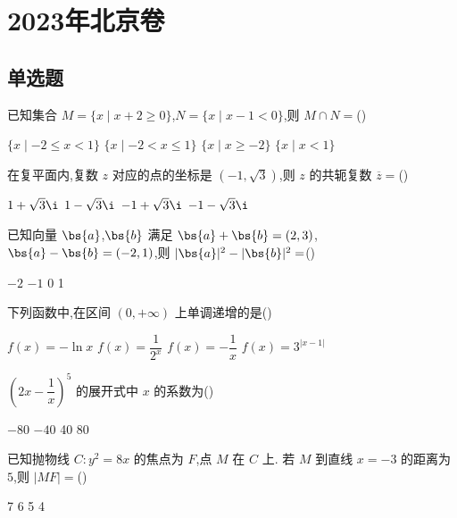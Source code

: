 \chapter{2023年北京卷}

\section{单选题}

\begin{problem}
已知集合 \(M=\{x\mid x+2\ge 0\}\),\(N=\{x\mid x-1<0\}\),则 \(M\cap N=\)(\quad)

\choices
    {\(\{x\mid -2\le x<1\}\)}
    {\(\{x\mid -2<x\le 1\}\)}
    {\(\{x\mid x\ge -2\}\)}
    {\(\{x\mid x<1\}\)}
\end{problem}

\begin{problem}
在复平面内,复数 \(z\) 对应的点的坐标是 \((-1,\sqrt{3})\),则 \(z\) 的共轭复数 \(\overline{z}=\)(\quad)

\choices
    {\(1+\sqrt{3}\i\)}
    {\(1-\sqrt{3}\i\)}
    {\(-1+\sqrt{3}\i\)}
    {\(-1-\sqrt{3}\i\)}
\end{problem}

\begin{problem}
已知向量 \(\bs{a}\),\(\bs{b}\) 满足 \(\bs{a}+\bs{b}=(2,3)\),\(\bs{a}-\bs{b}=(-2,1)\),则 \(|\bs{a}|^2-|\bs{b}|^2=\)(\quad)

\choices
    {\(-2\)}
    {\(-1\)}
    {0}
    {1}
\end{problem}

\begin{problem}
下列函数中,在区间 \((0,+\infty)\) 上单调递增的是(\quad)

\choices
    {\(f(x)=-\ln x\)}
    {\(f(x)=\dfrac{1}{2^x}\)}
    {\(f(x)=-\dfrac{1}{x}\)}
    {\(f(x)=3^{|x-1|}\)}
\end{problem}

\begin{problem}
\(\left(2x-\dfrac{1}{x}\right)^5\) 的展开式中 \(x\) 的系数为(\quad)

\choices
    {\(-80\)}
    {\(-40\)}
    {40}
    {80}
\end{problem}

\begin{problem}
已知抛物线 \(C:y^2=8x\) 的焦点为 \(F\),点 \(M\) 在 \(C\) 上. 若 \(M\) 到直线 \(x=-3\) 的距离为 \(5\),则 \(|MF|=\)(\quad)

\choices
    {7}
    {6}
    {5}
    {4}
\end{problem}

